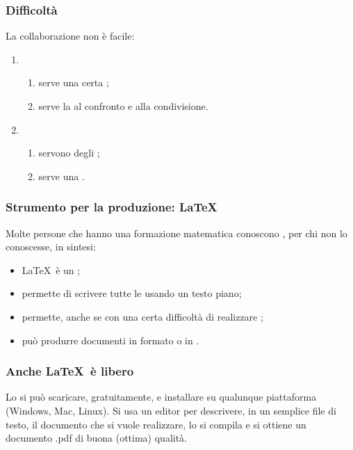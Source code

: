 \documentclass{beamer} %
\begin{document}
\begin{frame}\frametitle{Difficoltà}

La collaborazione non è facile:
\begin{enumerate} [<+->]
\item {}
\begin{enumerate}
\item serve una certa ;
\item serve la  al confronto e alla condivisione.
\end{enumerate}
\item {}
\begin{enumerate}
\item servono degli ;
\item serve una .
\end{enumerate}
\end{enumerate}

\end{frame}


\begin{frame}\frametitle{Strumento per la produzione: \LaTeX}

Molte persone che hanno una formazione matematica conoscono 
\orange{\LaTeX}, per chi non lo conoscesse, in sintesi:
\begin{itemize} %
\item \LaTeX\ è un ; 
\item permette di scrivere tutte le  usando un testo piano;
\item permette, anche se con una certa difficoltà di realizzare 
;
\item può produrre documenti in formato  o 
in .
\end{itemize}

\end{frame}


\begin{frame}\frametitle{Anche \LaTeX\ è libero}

Lo si può scaricare, gratuitamente, e installare 
su qualunque piattaforma (Windows, Mac, Linux).
\spause
Si usa un editor per descrivere, in un semplice file di testo, 
il documento che si vuole realizzare, lo si compila e si ottiene un 
documento .pdf di buona (ottima) qualità.

\end{frame}
\end{document}
